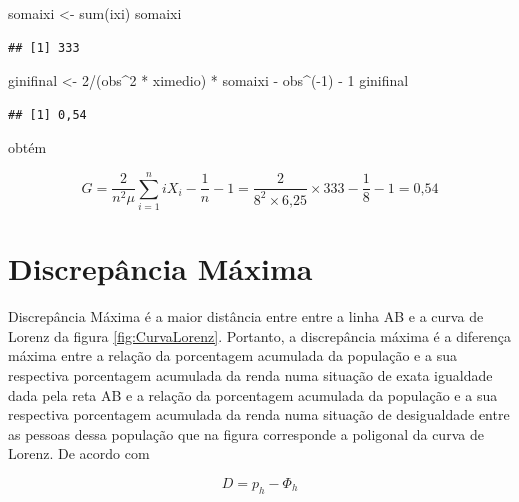 \documentclass[
]{book}
\newenvironment{Shaded}{\begin{snugshade}}{\end{snugshade}}
\newcommand{\DecValTok}[1]{\textcolor[rgb]{0.00,0.00,0.81}{#1}}
\newcommand{\FunctionTok}[1]{\textcolor[rgb]{0.00,0.00,0.00}{#1}}
\newcommand{\NormalTok}[1]{#1}
\newcommand{\OtherTok}[1]{\textcolor[rgb]{0.56,0.35,0.01}{#1}}
\newcommand{\SpecialCharTok}[1]{\textcolor[rgb]{0.00,0.00,0.00}{#1}}
\begin{document}
\begin{Shaded}
\begin{Highlighting}[]
\NormalTok{somaixi }\OtherTok{\textless{}{-}} \FunctionTok{sum}\NormalTok{(ixi)}
\NormalTok{somaixi}
\end{Highlighting}
\end{Shaded}

\begin{verbatim}
## [1] 333
\end{verbatim}

\begin{Shaded}
\begin{Highlighting}[]
\NormalTok{ginifinal }\OtherTok{\textless{}{-}} \DecValTok{2}\SpecialCharTok{/}\NormalTok{(obs}\SpecialCharTok{\^{}}\DecValTok{2} \SpecialCharTok{*}\NormalTok{ ximedio) }\SpecialCharTok{*}\NormalTok{ somaixi }\SpecialCharTok{{-}}\NormalTok{ obs}\SpecialCharTok{\^{}}\NormalTok{(}\SpecialCharTok{{-}}\DecValTok{1}\NormalTok{) }\SpecialCharTok{{-}} 
    \DecValTok{1}
\NormalTok{ginifinal}
\end{Highlighting}
\end{Shaded}

\begin{verbatim}
## [1] 0,54
\end{verbatim}

obtém

\[
  G = \dfrac{2}{n^2\mu}\sum_{i=1}^{n} iX_i - \dfrac{1}{n} - 1 = \dfrac{2}{\text{8}^2 \times \text{6,25}}\times \text{333} - \dfrac{1}{\text{8}} - 1 = \text{0,54}
\]

\hypertarget{discrepuxe2ncia-muxe1xima}{%
\section{Discrepância Máxima}\label{discrepuxe2ncia-muxe1xima}}

Discrepância Máxima é a maior distância entre entre a linha AB e a curva de Lorenz da figura \ref{fig:CurvaLorenz}. Portanto, a discrepância máxima é a diferença máxima entre a relação da porcentagem acumulada da população e a sua respectiva porcentagem acumulada da renda numa situação de exata igualdade dada pela reta AB e a relação da porcentagem acumulada da população e a sua respectiva porcentagem acumulada da renda numa situação de desigualdade entre as pessoas dessa população que na figura corresponde a poligonal da curva de Lorenz. De acordo com \citet{Hoffmann2006}

\[
  D = p_h - \Phi_h
  \label{eq:DiscrepanciaMaximaDefinicao}
\]
\end{document}
